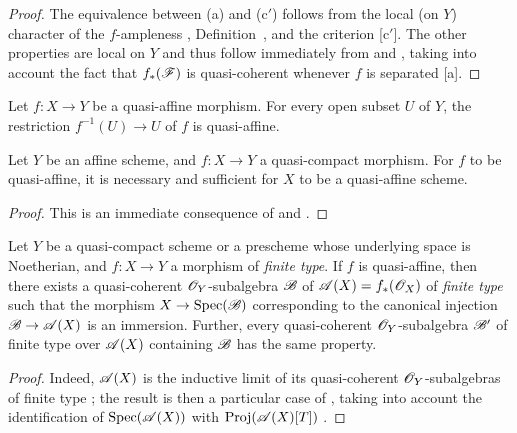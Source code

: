 \begin{proof}
The equivalence between (a) and (c$'$) follows from the local (on $Y$) character of the $f$-ampleness , Definition~, and the criterion [c$'$].
The other properties are local on $Y$
and thus follow immediately from  and , taking into account the fact that $f_*(\mathscr{F})$ is quasi-coherent whenever $f$ is separated [a].
\end{proof}

\begin{corollary}[5.1.7]
\label{II.5.1.7}
Let $f:X\to Y$ be a quasi-affine morphism.
For every open subset $U$ of $Y$, the restriction $f^{-1}(U)\to U$ of $f$ is quasi-affine.
\end{corollary}

\begin{corollary}[5.1.8]
\label{II.5.1.8}
Let $Y$ be an affine scheme, and $f:X\to Y$ a quasi-compact morphism.
For $f$ to be quasi-affine, it is necessary and sufficient for $X$ to be a quasi-affine scheme.
\end{corollary}

\begin{proof}
This is an immediate consequence of  and .
\end{proof}

\begin{corollary}[5.1.9]
\label{II.5.1.9}
Let $Y$ be a quasi-compact scheme or a prescheme whose underlying space is Noetherian, and $f:X\to Y$ a morphism of \emph{finite type}.
If $f$ is quasi-affine, then there exists a quasi-coherent $\mathscr{O}_Y$-subalgebra $\mathscr{B}$ of $\mathscr{A}(X)=f_*(\mathscr{O}_X)$ of \emph{finite type}  such that the morphism $X\to\Spec(\sh{B})$ corresponding to the canonical injection $\sh{B}\to\sh{A}(X)$ is an immersion.
Further, every quasi-coherent $\mathscr{O}_Y$-subalgebra $\mathscr{B}'$ of finite type over $\mathscr{A}(X)$ containing $\mathscr{B}$ has the same property.
\end{corollary}

\begin{proof}
Indeed, $\mathscr{A}(X)$ is the inductive limit of its quasi-coherent $\mathscr{O}_Y$-subalgebras of finite type ;
the result is then a particular case of , taking into account the identification of $\operatorname{Spec}(\mathscr{A}(X))$ with $\operatorname{Proj}(\mathscr{A}(X)[T])$ .
\end{proof}

